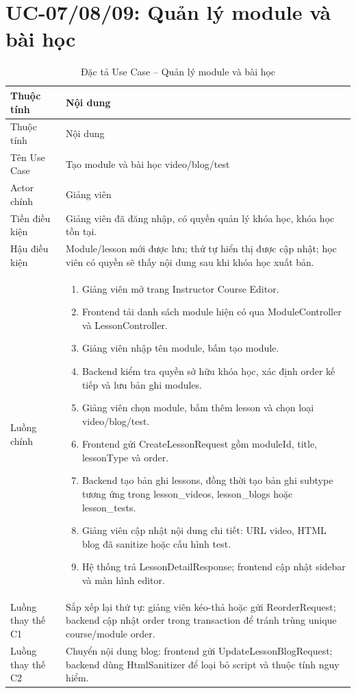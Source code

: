 \documentclass[12pt,a4paper]{report}
\begin{document}
\section{UC-07/08/09: Quản lý module và bài học}
\begin{longtable}{L{4cm} L{10.5cm}}
\caption{Đặc tả Use Case -- Quản lý module và bài học}\label{tab:uc-lesson}\\
\toprule
Thuộc tính & Nội dung \\
\midrule
\endfirsthead
\toprule
Thuộc tính & Nội dung \\
\midrule
\endhead
Tên Use Case & Tạo module và bài học video/blog/test \\
Actor chính & Giảng viên \\
Tiền điều kiện & Giảng viên đã đăng nhập, có quyền quản lý khóa học, khóa học tồn tại. \\
Hậu điều kiện & Module/lesson mới được lưu; thứ tự hiển thị được cập nhật; học viên có quyền sẽ thấy nội dung sau khi khóa học xuất bản. \\
Luồng chính & \begin{enumerate}[leftmargin=*]
\item Giảng viên mở trang Instructor Course Editor.
\item Frontend tải danh sách module hiện có qua ModuleController và LessonController.
\item Giảng viên nhập tên module, bấm tạo module.
\item Backend kiểm tra quyền sở hữu khóa học, xác định order kế tiếp và lưu bản ghi modules.
\item Giảng viên chọn module, bấm thêm lesson và chọn loại video/blog/test.
\item Frontend gửi CreateLessonRequest gồm moduleId, title, lessonType và order.
\item Backend tạo bản ghi lessons, đồng thời tạo bản ghi subtype tương ứng trong lesson\_videos, lesson\_blogs hoặc lesson\_tests.
\item Giảng viên cập nhật nội dung chi tiết: URL video, HTML blog đã sanitize hoặc cấu hình test.
\item Hệ thống trả LessonDetailResponse; frontend cập nhật sidebar và màn hình editor.
\end{enumerate} \\
Luồng thay thế C1 & Sắp xếp lại thứ tự: giảng viên kéo-thả hoặc gửi ReorderRequest; backend cập nhật order trong transaction để tránh trùng unique course/module order. \\
Luồng thay thế C2 & Chuyển nội dung blog: frontend gửi UpdateLessonBlogRequest; backend dùng HtmlSanitizer để loại bỏ script và thuộc tính nguy hiểm. \\

\end{longtable}
\end{document}
